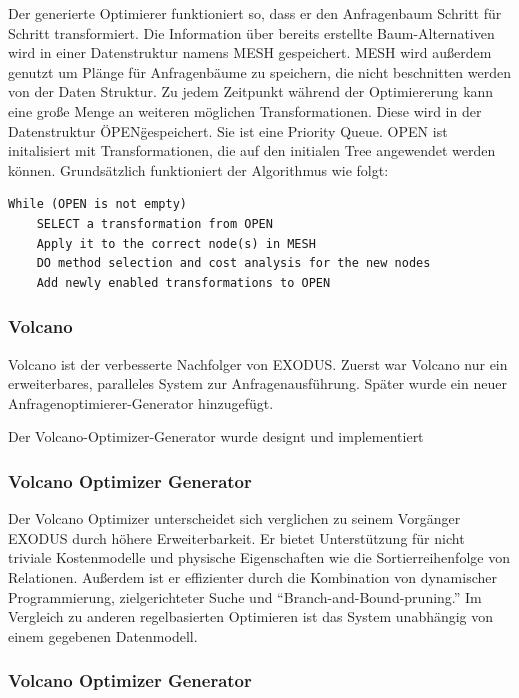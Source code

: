 Der generierte Optimierer funktioniert so, dass er den Anfragenbaum Schritt für Schritt transformiert. Die Information über bereits erstellte Baum-Alternativen wird in einer Datenstruktur namens MESH gespeichert. MESH wird außerdem genutzt um Plänge für Anfragenbäume zu speichern, die nicht beschnitten werden von der Daten Struktur. Zu jedem Zeitpunkt während der Optimiererung kann eine große Menge an weiteren möglichen Transformationen. Diese wird in der Datenstruktur \"OPEN\" gespeichert. Sie ist eine Priority Queue. OPEN ist initalisiert mit Transformationen, die auf den initialen Tree angewendet werden können. Grundsätzlich funktioniert der Algorithmus wie folgt:

\begin{lstlisting}[caption={Exekution in EXODUS}]
While (OPEN is not empty)
	SELECT a transformation from OPEN
	Apply it to the correct node(s) in MESH
	DO method selection and cost analysis for the new nodes
	Add newly enabled transformations to OPEN

\end{lstlisting}

\subsubsection{Volcano}

Volcano ist der verbesserte Nachfolger von EXODUS. Zuerst war Volcano nur ein erweiterbares, paralleles System zur Anfragenausführung. Später wurde ein neuer Anfragenoptimierer-Generator hinzugefügt. 

Der Volcano-Optimizer-Generator wurde designt und implementiert 





\subsubsection{Volcano Optimizer Generator}

Der Volcano Optimizer unterscheidet sich verglichen zu seinem Vorgänger EXODUS durch höhere Erweiterbarkeit. Er bietet Unterstützung für nicht triviale Kostenmodelle und physische Eigenschaften wie die Sortierreihenfolge von Relationen. Außerdem ist er effizienter durch die Kombination von dynamischer Programmierung, zielgerichteter Suche und “Branch-and-Bound-pruning.” Im Vergleich zu anderen regelbasierten Optimieren ist das System unabhängig von einem gegebenen Datenmodell.

\subsubsection{Volcano Optimizer Generator}

